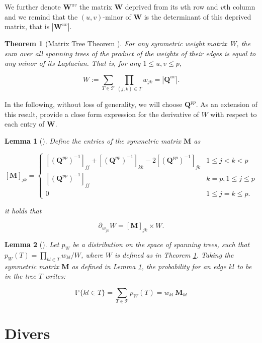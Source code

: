 \documentclass[11pt,a4paper]{article}
\newtheorem{theorem}{Theorem}
\newtheorem{lemma}{Lemma}
\newcommand{\Wbf}{\boldsymbol{W}}
\newcommand{\Qbf}{\boldsymbol{Q}}
\newcommand{\Mbf}{\boldsymbol{M}}
\begin{document}
We further denote $\Wbf^{uv}$ the matrix $\Wbf$ deprived from its $u$th row and $v$th column and we remind that the $(u, v)$-minor of $\Wbf$ is the determinant of this deprived matrix, that is $|\Wbf^{uv}|$.

\begin{theorem}[Matrix Tree Theorem  \cite{matrixtree,Meila}] \label{thm:MTT}
    For any symmetric weight matrix W, the sum over all spanning trees of the product of the weights of their edges is equal to any minor of its Laplacian. That is, for any $1 \leq u, v \leq p$,
 
   \[
    W := \sum_{T\in\mathcal{T}} \prod_{(j, k)\in T} w_{jk} = |\Qbf^{uv}|.
    \]
   
\end{theorem}    

In the following, without loss of generality, we will choose $\Qbf^{pp}$. As an extension of this result, \cite{Meila} provide a close form expression for the derivative of $W$ with respect to each entry of $\Wbf$. 

\begin{lemma} [\cite{Meila}] \label{lem:Meila}
    Define the entries of the symmetric matrix $\Mbf$ as
 
\[    
 [\Mbf]_{jk} =\begin{cases}
    \left[(\Qbf^{pp})^{-1}\right]_{jj} + \left[(\Qbf^{pp})^{-1}\right]_{kk} -2\left[(\Qbf^{pp})^{-1}\right]_{jk} & 1\leq j<k < p\\
    \left[(\Qbf^{pp})^{-1}\right]_{jj} & k=p, 1\leq j \leq p  \\
    0 & 1\leq j=k \leq p.
    \end{cases}
\]
 
it holds that
 
$$
\partial_{w_{jk}} W = [\Mbf]_{jk}  \times W.
$$
\end{lemma}
\begin{lemma} [\cite{kirshner}] \label{lem:Kirshner}
    Let $p_W$ be a distribution on the space of spanning trees, such that $p_W(T)=\prod_{kl\in T} w_{kl} / W$, where $W$ is defined as in Theorem \ref{thm:MTT}. Taking the symmetric matrix $\Mbf$ as defined in Lemma  \ref{lem:Meila}, the probability for an edge $kl$ to be in the tree $T$ writes:
 
$$\mathds{P}\{kl\in T\} = \sum_{T\in \mathcal{T}} p_W(T)= w_{kl}\: \Mbf_{kl}$$
\end{lemma}
 \section{Divers}
 
\end{document}
